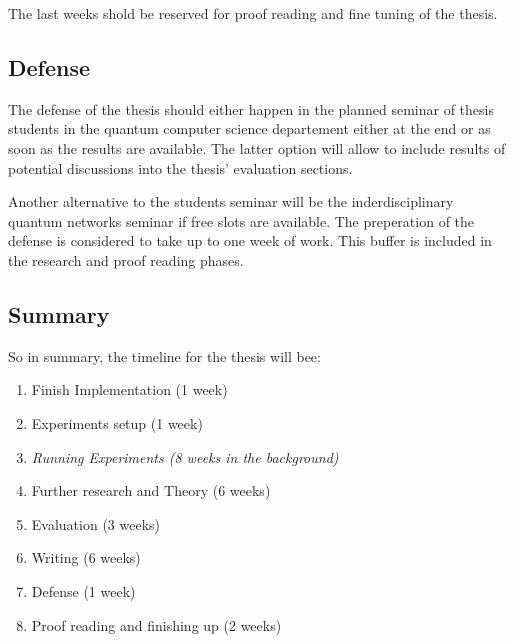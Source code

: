 The last weeks shold be reserved for proof reading and fine tuning of the thesis. 

\subsection{Defense}
The defense of the thesis should either happen in the planned seminar of thesis students in the quantum computer
science departement either at the end or as soon as the results are available. The latter option will allow to include 
results of potential discussions into the thesis' evaluation sections.

Another alternative to the students seminar will be the inderdisciplinary quantum networks seminar if free slots are available. The preperation 
of the defense is considered to take up to one week of work. This buffer is included in the research and proof reading
phases.

\subsection{Summary}
So in summary, the timeline for the thesis will bee:

\begin{enumerate}
    \item Finish Implementation (1 week)
    \item Experiments setup (1 week)
    \item \textit{Running Experiments (8 weeks in the background)}
    \item Further research and Theory (6 weeks)
    \item Evaluation (3 weeks)
    \item Writing (6 weeks)
    \item Defense (1 week)
    \item Proof reading and finishing up (2 weeks)
\end{enumerate}